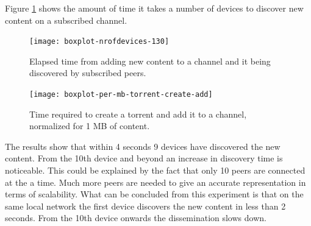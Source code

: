 Figure \ref{fig:boxplot-nr.of.devices-130} shows the amount of time it takes a number of devices to discover new content on a subscribed channel.
\begin{figure}[h]
	\centering %
	\texttt{[image: boxplot-nrofdevices-130]}
	\caption{Elapsed time from adding new content to a channel and it being discovered by subscribed peers.}
	\label{fig:boxplot-nr.of.devices-130}
\end{figure}
\begin{figure}[h]
	\centering
	\texttt{[image: boxplot-per-mb-torrent-create-add]}
	\caption{Time required to create a torrent and add it to a channel, normalized for 1 MB of content.}
	\label{fig:boxplot-per-mb-torrent-create-add}
\end{figure}
The results show that within 4 seconds 9 devices have discovered the new content.
From the 10th device and beyond an increase in discovery time is noticeable.
This could be explained by the fact that only 10 peers are connected at the a time.
Much more peers are needed to give an accurate representation in terms of scalability.
What can be concluded from this experiment is that on the same local network the first device discovers the new content in less than 2 seconds.
From the 10th device onwards the dissemination slows down.


